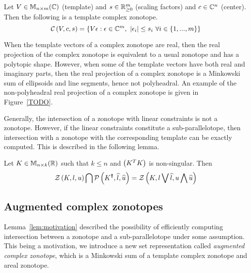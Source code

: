 \begin{definition}
Let $V\in\mathbb{M}_{n\times m}(\mathbb{\mathbb{C}})$ (template) and $s\in\mathbb{R}^m_{\geq 0}$ (scaling factors) and
$c\in\mathbb{C}^n$ (center).  Then the following is a template complex zonotope.
\begin{equation*}
\mathcal{C}\left(V,c,s\right) =
\left\{V\epsilon:\epsilon\in\mathbb{C}^m,~\left|\epsilon_i\right|\leq s_i~\forall
i\in\{1,...,m\}\right\}
\end{equation*}
\end{definition}

When the template vectors of a complex zonotope are real, then the
real projection of the complex zonotope is equivalent to a usual
zonotope and has a polytopic shape.  However, when some of the
template vectors have both real and imaginary parts, then the real
projection of a complex zonotope is a Minkowski sum of ellipsoids and
line segments, hence not polyheadral.  An example of the non-polyheadral
real projection of a complex zonotope is given in Figure~\ref{TODO}.


Generally, the intersection of a zonotope with linear constraints is
not a zonotope.  However, if the linear constraints constitute a
sub-parallelotope, then intersection with a zonotope with the
corresponding template can be exactly computed.  This is described in
the following lemma.
%
\begin{lemma}\label{lem:motivation}
Let $K\in\mathbb{M}_{n\times k}(\mathbb{R})$ such that $k\leq n$ and $\left(K^TK\right)$ is
non-singular.  Then
\[
\mathcal{Z}\left(K,l,u\right) \bigcap \mathcal{P}\left(K^{\bm{\dagger}},\widehat{l},\widehat{u}\right)
= \mathcal{Z}\left(K,l\bigvee \widehat{l},u\bigwedge \widehat{u}\right)
\]
\end{lemma}
%

\subsection{Augmented complex zonotopes}
Lemma~\ref{lem:motivation} described the possibility of efficiently
computing intersection between a zonotope and a sub-parallelotope
under some assumption.  This being a motivation, we introduce a new
set representation called \emph{augmented complex zonotope}, which is
a Minkowski sum of a template complex zonotope and areal zonotope.

